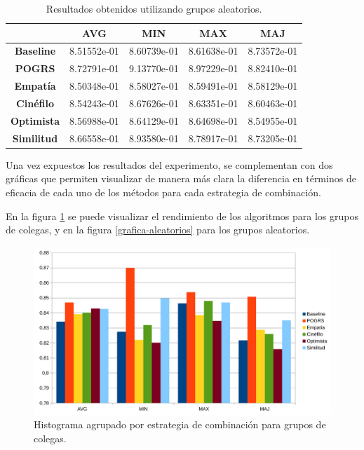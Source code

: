 \begin{table}[H]
	\centering
	\begin{tabular}{ccccc}
		\toprule
		{} & \textbf{AVG} & \textbf{MIN} & \textbf{MAX} & \textbf{MAJ} \\
		\midrule
		\textbf{Baseline} & 8.51552e-01 & 8.60739e-01 & 8.61638e-01 & 8.73572e-01 \\
		\midrule
		\textbf{POGRS} & 8.72791e-01 & 9.13770e-01 & 8.97229e-01 & 8.82410e-01 \\
		\midrule
		\textbf{Empatía} & 8.50348e-01 & 8.58027e-01 & 8.59491e-01 & 8.58129e-01 \\
		\textbf{Cinéfilo} & 8.54243e-01 & 8.67626e-01 & 8.63351e-01 & 8.60463e-01 \\
		\textbf{Optimista} & 8.56988e-01 & 8.64129e-01 & 8.64698e-01 & 8.54955e-01 \\
		\textbf{Similitud} & 8.66558e-01 & 8.93580e-01 & 8.78917e-01 & 8.73205e-01 \\
		\bottomrule
	\end{tabular}
	\caption{Resultados obtenidos utilizando grupos aleatorios.}
	\label{t:resultados-aleatorios}
\end{table}

Una vez expuestos los resultados del experimento, se complementan con dos gráficas que permiten visualizar de manera más clara la diferencia en términos de eficacia de cada uno de los métodos para cada estrategia de combinación.

En la figura \ref{grafica-colegas} se puede visualizar el rendimiento de los algoritmos para los grupos de colegas, y en la figura \ref{grafica-aleatorios} para los grupos aleatorios.

\begin{figure}[H]
	\centering
	\includegraphics[scale=0.6]{imagenes/grafica-colegas.pdf}
	\caption{Histograma agrupado por estrategia de combinación para grupos de colegas.}
	\label{grafica-colegas}
\end{figure}

